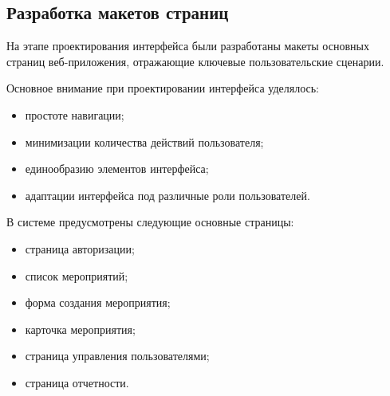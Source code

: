 \subsection{Разработка макетов страниц}

На этапе проектирования интерфейса были разработаны макеты основных
страниц веб-приложения, отражающие ключевые пользовательские сценарии.

Основное внимание при проектировании интерфейса уделялось:

\begin{itemize}
	\item простоте навигации;
	\item минимизации количества действий пользователя;
	\item единообразию элементов интерфейса;
	\item адаптации интерфейса под различные роли пользователей.
\end{itemize}

В системе предусмотрены следующие основные страницы:

\begin{itemize}
	\item страница авторизации;
	\item список мероприятий;
    \item форма создания мероприятия;
	\item карточка мероприятия;
	\item страница управления пользователями;
	\item страница отчетности.
\end{itemize}

